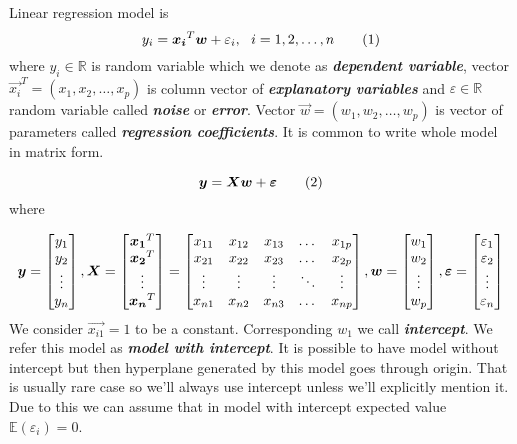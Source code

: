 \begin{definition}\label{definition:lr_model}
    Linear regression model is 
    \[ 
        y_i = \vec{x_i}^T\vec{w} + \varepsilon_i\\, \ \  i = 1,2,\ldots,n \numberthis
    \]
where $y_i \in \mathbb{R}$ is random variable which we denote as \textbf{\textit{dependent variable}}, vector $\vec{x_i}^T = (x_1, x_2, \ldots, x_p)$ is column vector of \textbf{\textit{explanatory variables}} and $\varepsilon \in \mathbb{R}$ random variable called \textbf{\textit{noise}} or \textbf{\textit{error}}. Vector $\vec{w} = (w_1, w_2, \ldots, w_p)$ is vector of parameters called  \textbf{\textit{regression coefficients}}. It is common to write whole model in matrix form. 

\[ 
    \vec{y} = \vec{X}\vec{w} + \vec{\varepsilon}    \numberthis
\] where

\[ 
\vec{y} = \begin{bmatrix}
    y_{1} \\
    y_{2} \\
    \vdots \\
    y_{n}
  \end{bmatrix}\\,
 \vec{X} = \begin{bmatrix}
    \vec{x_1}^T \\
    \vec{x_2}^T \\
    \vdots \\
    \vec{x_n}^T
\end{bmatrix}
=
\begin{bmatrix}
    x_{11} & x_{12} & x_{13} & \dots  & x_{1p} \\
    x_{21} & x_{22} & x_{23} & \dots  & x_{2p} \\
    \vdots & \vdots & \vdots & \ddots & \vdots \\
    x_{n1} & x_{n2} & x_{n3} & \dots  & x_{np}
\end{bmatrix}\\,
\vec{w} = \begin{bmatrix}
    w_{1} \\
    w_{2} \\
    \vdots \\
    w_{p}
  \end{bmatrix}\\,
  \vec{\varepsilon} = \begin{bmatrix}
    \varepsilon_{1} \\
    \varepsilon_{2} \\
    \vdots \\
    \varepsilon_{n}
  \end{bmatrix}
\]
We consider $\vec{x_{i1}} = 1$ to be a constant. Corresponding $w_{1}$ we call \textbf{\textit{intercept}}. We refer this model as \textbf{\textit{model with intercept}}. It is possible to have model without intercept but then hyperplane generated by this model goes through origin. That is usually rare case so we'll always use intercept unless we'll explicitly mention it. Due to this we can assume that in model with intercept expected value  $\mathbb{E}(\varepsilon_i) = 0$.
\end{definition}

